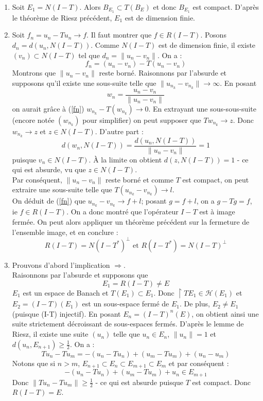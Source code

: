 \begin{dem}
\begin{enumerate}
	\item Soit $E_1=N(I-T)$. Alors $B_{E_1}\subset T(B_E)$ et donc $B_{E_1}$ est compact. D'après le théorème de Riesz précédent, $E_1$ est de dimension finie.
	\item Soit $f_n=u_n-Tu_n\to f$. Il faut montrer que $f\in R(I-T)$. Posons $d_n=d(u_n,N(I-T))$. Comme $N(I-T)$ est de dimension finie, il existe $(v_n)\subset N(I-T)$ tel que $d_n=\|u_n-v_n\|$. On a : \begin{equation} \label{fn} f_n=(u_n-v_n)-T(u_n-v_n) \end{equation}
Montrons que $\|u_n-v_n\|$ reste borné. Raisonnons par l'absurde et supposons qu'il existe une sous-suite telle que $\|u_{n_k}-v_{n_k}\|\to\infty$. En posant \[w_n=\frac{u_n-v_n}{\|u_n-v_n\|}\] on aurait grâce à (\ref{fn}) $w_{n_k}-T(w_{n_k})\to 0$. En extrayant une sous-sous-suite (encore notée $(w_{n_k})$ pour simplifier) on peut supposer que $Tw_{n_k}\to z$. Donc $w_{n_k}\to z$ et $z\in N(I-T)$. D'autre part :
	\[d(w_n,N(I-T))=\frac{d(u_n,N(I-T))}{\|u_n-v_n\|}=1\]
puisque $v_n\in N(I-T)$. À la limite on obtient $d(z,N(I-T))=1$ - ce qui est absurde, vu que $z\in N(I-T)$.\\
Par conséquent, $\|u_n-v_n\|$ reste borné et comme $T$ est compact, on peut extraire une sous-suite telle que $T(u_{n_k}-v_{n_k})\to l$.\\
On déduit de (\ref{fn}) que $u_{n_k}-v_{n_k}\to f+l$; posant $g=f+l$, on a $g-Tg=f$, ie $f\in R(I-T)$. On a donc montré que l'opérateur $I-T$ est à image fermée. On peut alors appliquer un théorème précédent sur la fermeture de l'ensemble image, et en conclure : 
	\[R(I-T)=N(I-T^*)^\perp \text{ et } R(I-T^*)=N(I-T)^\perp\]

	\item Prouvons d'abord l'implication $\Rightarrow$.\\
Raisonnons par l'absurde et supposons que \[E_1=R(I-T)\neq E\]
$E_1$ est un espace de Banach et $T(E_1)\subset E_1$. Donc $\restriction{T}{E_1}\in\mathscr{H}(E_1)$ et $E_2=(I-T)(E_1)$ est un sous-espace fermé de $E_1$. De plus, $E_2\neq E_1$ (puisque (I-T) injectif). En posant $E_n=(I-T)^n(E)$, on obtient ainsi une suite strictement décroissant de sous-espaces fermés. D'après le lemme de Riesz, il existe une suite $(u_n)$ telle que $u_n\in E_n$, $\|u_n\|=1$ et $d(u_n,E_{n+1})\geq \frac{1}{2}$. On a : \[Tu_n-Tu_m=-(u_n-Tu_n)+(u_m-Tu_m)+(u_n-u_m)\]
Notons que si $n>m$, $E_{n+1}\subset E_n\subset E_{m+1}\subset E_m$ et par conséquent : \[-(u_n-Tu_n)+(u_m-Tu_m)+u_n\in E_{m+1}\]
Donc $\|Tu_n-Tu_m\|\geq\frac{1}{2}$ - ce qui est absurde puisque $T$ est compact. Donc $R(I-T)=E$.


\end{enumerate}
\end{dem}
